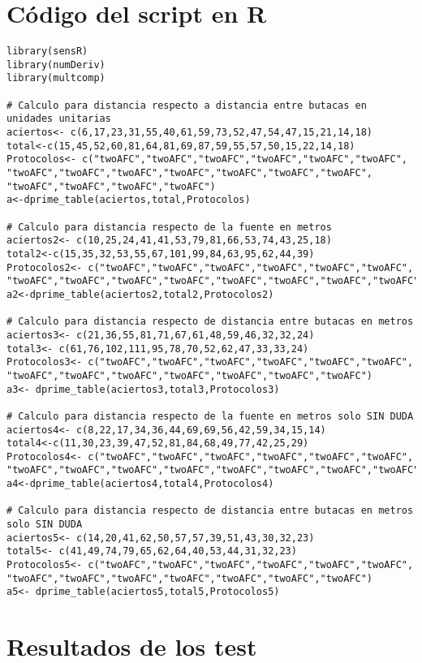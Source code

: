 \documentclass[11pt,a4paper,twoside]{book}
\begin{document}
\chapter{Código del script en R}
\begin{verbatim}
library(sensR)
library(numDeriv)
library(multcomp)

# Calculo para distancia respecto a distancia entre butacas en unidades unitarias
aciertos<- c(6,17,23,31,55,40,61,59,73,52,47,54,47,15,21,14,18)
total<-c(15,45,52,60,81,64,81,69,87,59,55,57,50,15,22,14,18)
Protocolos<- c("twoAFC","twoAFC","twoAFC","twoAFC","twoAFC","twoAFC",
"twoAFC","twoAFC","twoAFC","twoAFC","twoAFC","twoAFC","twoAFC",
"twoAFC","twoAFC","twoAFC","twoAFC")
a<-dprime_table(aciertos,total,Protocolos)

# Calculo para distancia respecto de la fuente en metros
aciertos2<- c(10,25,24,41,41,53,79,81,66,53,74,43,25,18)
total2<-c(15,35,32,53,55,67,101,99,84,63,95,62,44,39)
Protocolos2<- c("twoAFC","twoAFC","twoAFC","twoAFC","twoAFC","twoAFC",
"twoAFC","twoAFC","twoAFC","twoAFC","twoAFC","twoAFC","twoAFC","twoAFC")
a2<-dprime_table(aciertos2,total2,Protocolos2)

# Calculo para distancia respecto de distancia entre butacas en metros
aciertos3<- c(21,36,55,81,71,67,61,48,59,46,32,32,24)
total3<- c(61,76,102,111,95,78,70,52,62,47,33,33,24)
Protocolos3<- c("twoAFC","twoAFC","twoAFC","twoAFC","twoAFC","twoAFC",
"twoAFC","twoAFC","twoAFC","twoAFC","twoAFC","twoAFC","twoAFC")
a3<- dprime_table(aciertos3,total3,Protocolos3)

# Calculo para distancia respecto de la fuente en metros solo SIN DUDA
aciertos4<- c(8,22,17,34,36,44,69,69,56,42,59,34,15,14)
total4<-c(11,30,23,39,47,52,81,84,68,49,77,42,25,29)
Protocolos4<- c("twoAFC","twoAFC","twoAFC","twoAFC","twoAFC","twoAFC",
"twoAFC","twoAFC","twoAFC","twoAFC","twoAFC","twoAFC","twoAFC","twoAFC")
a4<-dprime_table(aciertos4,total4,Protocolos4)

# Calculo para distancia respecto de distancia entre butacas en metros solo SIN DUDA
aciertos5<- c(14,20,41,62,50,57,57,39,51,43,30,32,23)
total5<- c(41,49,74,79,65,62,64,40,53,44,31,32,23)
Protocolos5<- c("twoAFC","twoAFC","twoAFC","twoAFC","twoAFC","twoAFC",
"twoAFC","twoAFC","twoAFC","twoAFC","twoAFC","twoAFC","twoAFC")
a5<- dprime_table(aciertos5,total5,Protocolos5)

\end{verbatim}

\chapter{Resultados de los test}
\end{document}
